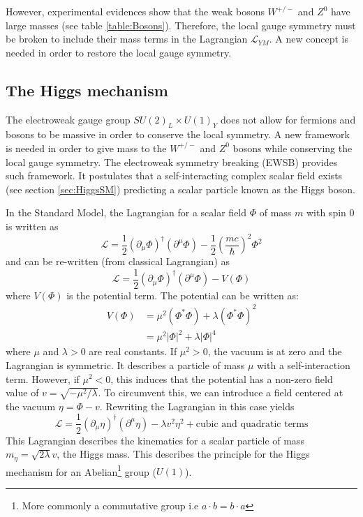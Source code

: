 However, experimental evidences \cite{Rubbia:1983pta} show that the weak bosons $W^{+/-}$ and $Z^0$ have large masses (see table \ref{table:Bosons}). Therefore, the local gauge symmetry must be broken to include their mass terms in the Lagrangian $\mathcal{L}_{YM}$. A new concept is needed in order to restore the local gauge symmetry.

\subsection{The Higgs mechanism}
\label{subsec:HiggsMecha}

The electroweak gauge group $SU(2)_{L} \times U(1)_{Y}$ does not allow for fermions and bosons to be massive in order to conserve the local symmetry. A new framework is needed in order to give mass to the $W^{+/-}$ and $Z^0$ bosons while conserving the local gauge symmetry. The electroweak symmetry breaking (EWSB) provides such framework. It postulates that a self-interacting complex scalar field exists (see section \ref{sec:HiggsSM}) predicting a scalar particle known as the Higgs boson.

In the Standard Model, the Lagrangian for a scalar field $\Phi$ of mass $m$ with spin 0 is written as \cite{Griffiths:343277}
\begin{equation}
  \mathcal{L} = \frac{1}{2}(\partial_{\mu}\Phi)^{\dagger}(\partial^{\mu}\Phi) - \frac{1}{2}\left(\frac{mc}{\hbar}\right)^2\Phi^2
\end{equation}
and can be re-written (from classical Lagrangian) as
\begin{equation} \label{eq:HiggsLag}
  \mathcal{L} = \frac{1}{2}(\partial_{\mu}\Phi)^{\dagger}(\partial^{\mu}\Phi) - V(\Phi)
\end{equation}
where $V(\Phi)$ is the potential term. The potential can be written as:
\begin{equation} \label{eq:HiggsPotential}
  \begin{aligned}
    V(\Phi) & = \mu^2(\Phi^*\Phi) + \lambda(\Phi^*\Phi)^2 \\
    & = \mu^2|\Phi|^2 + \lambda|\Phi|^4
  \end{aligned}
\end{equation}
where $\mu$ and $\lambda > 0$ are real constants. If $\mu^2 > 0$, the vacuum is at zero and the Lagrangian is symmetric. It describes a particle of mass $\mu$ with a self-interaction term. However, if $\mu^2 < 0$, this induces that the potential has a non-zero field value of $v = \sqrt{-\mu^2/\lambda}$. To circumvent this, we can introduce a field centered at the vacuum $\eta = \Phi - v$. Rewriting the Lagrangian in this case yields
\begin{equation}
  \mathcal{L} = \frac{1}{2}(\partial_{\mu}\eta)^{\dagger}(\partial^{\mu}\eta) - \lambda v^2\eta^2 + \text{cubic and quadratic terms}
\end{equation}
This Lagrangian describes the kinematics for a scalar particle of mass $m_{\eta} = \sqrt{2\lambda}v$, the Higgs mass. This describes the principle for the Higgs mechanism for an Abelian\footnote{More commonly a commutative group i.e $a \cdot b = b \cdot a$} group ($U(1)$).

